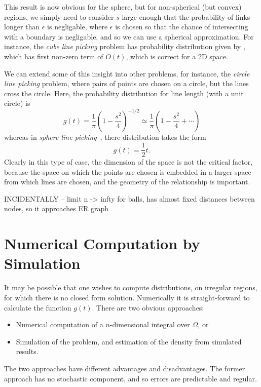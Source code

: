 \documentclass{article}
\begin{document}
This result is now obvious for the sphere, but for non-spherical (but
convex) regions, we simply need to consider $s$ large enough that the
probability of links longer than $\epsilon$ is negligable, where
$\epsilon$ is chosen so that the chance of intersecting with a
boundary is negligable, and so we can use a spherical
approximation. For instance, the {\em cube line picking} problem has
probability distribution given by \cite{weisstein:_cube_line_picking},
which has first non-zero term of $O(t)$, which is correct for a 2D
space.


We can extend some of this insight into other problems, for instance,
the {\em circle line picking} problem, where pairs of points are
chosen on a circle, but the lines cross the circle. Here, the
probability distribution for line length (with a unit circle) is
\cite{weisstein:_circle_line_picking}
\begin{equation}
  \label{eq:circle_line_picking}
  g(t) = \frac{1}{\pi} \left(    
           1 - \frac{s^2}{4}
               \right)^{-1/2} 
       \simeq \frac{1}{\pi} \left( 1 - \frac{s^2}{4} + \cdots \right) 
\end{equation}
whereas in {\em sphere line
  picking}~\cite{weisstein:_sphere_line_picking}, there distribution
takes the form
\begin{equation}
  \label{eq:sphere_line_picking_approx}
  g(t) = \frac{1}{2} t.
\end{equation}
Clearly in this type of case, the dimension of the space is not the
critical factor, because the space on which the points are chosen is
embedded in a larger space from which lines are chosen, and the
geometry of the relationship is important.


INCIDENTALLY -- limit n -> infty for balls, has almost fixed distances
between nodes, so it approaches ER graph




\section{Numerical Computation by Simulation}
\label{sec:numerical}

It may be possible that one wishes to compute distributions, on
irregular regions, for which there is no closed form solution.
Numerically it is straight-forward to calculate the function
$g(t)$. There are two obvious approaches:
\begin{itemize}

\item Numerical computation of a $n$-dimensional integral over
  $\Omega$, or

\item Simulation of the problem, and estimation of the density from
  simulated results. 

\end{itemize}
The two approaches have different advantages and disadvantages. The
former approach has no stochastic component, and so errors are
predictable and regular. 
\end{document}
